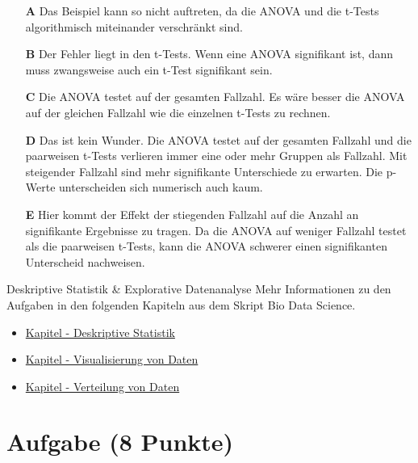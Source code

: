\documentclass[a4paper, 9pt]{scrartcl}\usepackage[]{graphicx}\usepackage[]{xcolor}
\begin{document}
\begin{enumerate}
\item [\textbf{A} \msquare] Das Beispiel kann so nicht auftreten, da die ANOVA und die t-Tests algorithmisch miteinander verschränkt sind.
\item [\textbf{B} \msquare] Der Fehler liegt in den t-Tests. Wenn eine ANOVA signifikant ist, dann muss zwangsweise auch ein t-Test signifikant sein.
\item [\textbf{C} \msquare] Die ANOVA testet auf der gesamten Fallzahl. Es wäre besser die ANOVA auf der gleichen Fallzahl wie die einzelnen t-Tests zu rechnen.
\item [\textbf{D} \msquare] Das ist kein Wunder. Die ANOVA testet auf der gesamten Fallzahl und die paarweisen t-Tests verlieren immer eine oder mehr Gruppen als Fallzahl. Mit steigender Fallzahl sind mehr signifikante Unterschiede zu erwarten. Die p-Werte unterscheiden sich numerisch auch kaum.
\item [\textbf{E} \msquare] Hier kommt der Effekt der stiegenden Fallzahl auf die Anzahl an signifikante Ergebnisse zu tragen. Da die ANOVA auf weniger Fallzahl testet als die paarweisen t-Tests, kann die ANOVA schwerer einen signifikanten Unterscheid nachweisen.
\end{enumerate}
    
\clearpage
\begin{graybox}{Deskriptive Statistik \& Explorative Datenanalyse}
Mehr Informationen zu den Aufgaben in den folgenden Kapiteln aus dem Skript Bio Data Science.
  \begin{itemize}
  \item \href{https://jkruppa.github.io/eda-descriptive.html}{Kapitel - Deskriptive Statistik}
  \item \href{https://jkruppa.github.io/eda-ggplot.html}{Kapitel - Visualisierung von Daten}
  \item \href{https://jkruppa.github.io/eda-distribution.html}{Kapitel - Verteilung von Daten}
  \end{itemize}
\end{graybox}
\clearpage

\section{Aufgabe \hfill (8 Punkte)}
\end{document}
